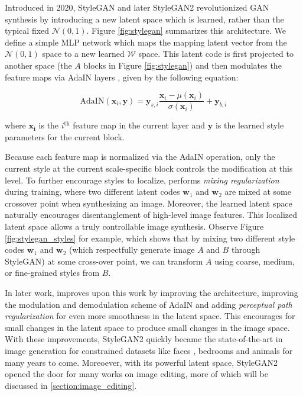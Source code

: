 \label{par:latent_space}
Introduced in 2020, StyleGAN \citep{karra2019stylegan} and later StyleGAN2 \citep{karra2020stylegan2}
revolutionized \ac{GAN} synthesis by introducing a new latent space which is learned, rather than the 
typical fixed $\mathcal{N}(0,1)$. Figure \ref{fig:stylegan} summarizes this architecture. We define a 
simple \ac{MLP} network which maps the mapping latent vector from the $\mathcal{N}(0,1)$ space to a new 
learned $\mathcal{W}$ space. This latent code is first projected to another space (the $A$ blocks 
in Figure \ref{fig:stylegan}) and
 then modulates the feature maps via \ac{AdaIN} layers \citep{huang2017arbitrary}, given by the following 
 equation:

 \begin{equation}
      \text{AdaIN}(\mathbf{x}_i, \mathbf{y}) = \mathbf{y}_{s, i}\frac{\mathbf{x}_i - \mu(\mathbf{x}_i)}{\sigma(\mathbf{x}_i)} + \mathbf{y}_{b,i}
 \end{equation}

where $\mathbf{x_i}$ is the $i^{\text{th}}$ feature map in the current layer and $\mathbf{y}$ is 
the learned style parameters for the current block. 

Because each feature map is normalized via the \ac{AdaIN} operation, only the current style at the 
current scale-specific block controls the modification at this level. To further encourage 
styles to localize, \cite{karra2019stylegan} performs \emph{mixing regularization} during training, 
where two different latent codes $\mathbf{w}_1$ and $\mathbf{w}_2$ are mixed at some crossover point 
when synthesizing an image. Moreover, the learned latent 
space naturally encourages disentanglement of high-level image features. This localized latent space
allows a truly controllable image synthesis. Observe 
Figure \ref{fig:stylegan_styles} for example, which shows that by mixing two different style codes 
$\textbf{w}_1$ and $\textbf{w}_2$ (which respectfully generate image $A$ and $B$
through StyleGAN) 
at some cross-over point, we can transform $A$ using coarse, 
medium, or fine-grained styles from $B$. 

In later work, \cite{karra2020stylegan2} improves upon this work by improving the 
architecture, improving the modulation and demodulation scheme of \ac{AdaIN} and adding 
\emph{perceptual path regularization} for even more smoothness in the latent space. 
This encourages for small changes in the latent space to produce small changes in the 
image space. With these improvements, StyleGAN2 quickly became the state-of-the-art 
in image generation for constrained datasets like faces \citep{celeba,karras2018progressive},
 bedrooms and animals \citep{lsun} for many years to come. Moreoever, with its 
 powerful latent space, StyleGAN2 opened the door for many works on image editing, 
 more of which will be discussed in \ref{section:image_editing}.
 

